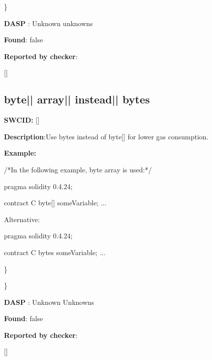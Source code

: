 \documentclass{article}
\begin{document}
\} 

\textbf{DASP} : Unknown unknowns

\textbf{Found}: false

\textbf{Reported by checker}: 
\begin{ffcode} 

[]
\end{ffcode} 
\subsection{byte{|\textunderscore| }array{|\textunderscore| }instead{|\textunderscore| }bytes} 
\textbf{SWC{\textunderscore }ID:} []

\textbf{Description}:Use bytes instead of byte[] for lower gas consumption.


\textbf{Example:} 
\begin{ffcode} 

/*In the following example, byte array is used:*/ 

pragma solidity 0.4.24;

contract C {
    byte[] someVariable;
    ...
}

Alternative:

pragma solidity 0.4.24;

contract C {
    bytes someVariable;
    ...
}

\end{ffcode} 
\} 

\} 

\textbf{DASP} : Unknown Unknowns

\textbf{Found}: false

\textbf{Reported by checker}: 
\begin{ffcode} 

[]
\end{ffcode} 
\end{document}
